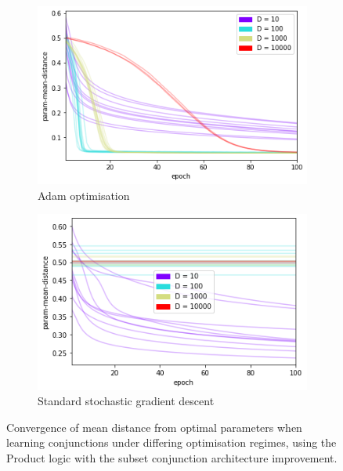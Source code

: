 \begin{figure}[h]
    \centering
    \begin{subfigure}[b]{0.45\textwidth}
        \centering
        \includegraphics[width=\textwidth]{imgs/conj-pmd-prod-keep50-5t.png}
        \caption{Adam optimisation}
        \label{fig:conjadam}
    \end{subfigure}
    \begin{subfigure}[b]{0.45\textwidth}
        \centering
        \includegraphics[width=\textwidth]{imgs/conj-pmd-prod-keep50-5t-sgd.png}
        \caption{Standard stochastic gradient descent}
        \label{fig:conjsgd}
    \end{subfigure}
       \caption{Convergence of mean distance from optimal parameters when learning conjunctions under differing optimisation regimes, using the Product logic with the subset conjunction architecture improvement.}
       \label{fig:conjsgdvsadam}
\end{figure}

